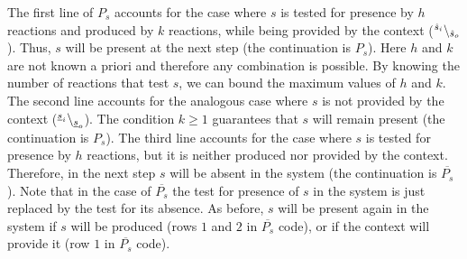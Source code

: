 The first line of $P_s$ accounts for the case where $s$ is tested for presence by $h$ reactions and produced by $k$ reactions, while being provided by the context (${}^{\hat{s}_i} \backslash_{\hat{s}_o}$).
Thus, $s$ will be present at the next step (the continuation is $P_s$). Here $h$ and $k$ are not known a priori and therefore any
combination is possible. By knowing the number of reactions that test $s$, we can bound the maximum 
values of $h$ and $k$.
The second line accounts for the analogous case where $s$ is not provided by the context (${}^{\underline{s}_i} \backslash_{\underline{s}_o}$). 
The condition $k\geq 1$ guarantees that $s$ will remain present (the continuation is $P_s$).
The third line accounts for the case where $s$ is tested for presence by $h$ reactions, but it is neither produced nor provided by  the context. Therefore, in the next step $s$ will be absent in the system (the continuation is $\overline{P_s}$).
Note that in the case of $\overline{P_s}$ the test for presence of $s$ in the system is just replaced by the test for its absence. As before, $s$ will be present again in the system if $s$ will be produced (rows $1$ and $2$ in  $\overline{P_s}$ code), or if the context will provide it (row $1$ in $\overline{P_s}$ code).

